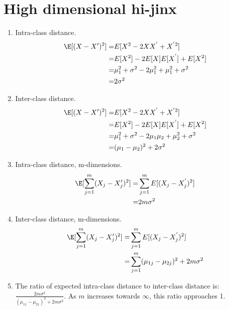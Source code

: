 \section{High dimensional hi-jinx}

\begin{enumerate}
\item Intra-class distance. \begin{align*}
\E[(X-X')^{2}]= & E[X^{2}-2XX^{'}+X^{'2}]\\
= & E[X^{2}]-2E[X]E[X^{'}]+E[X^{2}]\\
= & \mu_{1}^{2}+\sigma^{2}-2\mu_{1}^{2}+\mu_{1}^{2}+\sigma^{2}\\
= & 2\sigma^{2}\end{align*}

\item Inter-class distance. \begin{align*}
\E[(X-X')^{2}]= & E[X^{2}-2XX^{'}+X^{'2}]\\
= & E[X^{2}]-2E[X]E[X^{'}]+E[X^{2}]\\
= & \mu_{1}^{2}+\sigma^{2}-2\mu_{1}\mu_{2}+\mu_{2}^{2}+\sigma^{2}\\
= & (\mu_{1}-\mu_{2})^{2}+2\sigma^{2}\end{align*}

\item Intra-class distance, m-dimensions. \begin{align*}
\E[\sum_{j=1}^{m}(X_{j}-X'_{j})^{2}]= & \sum_{j=1}^{m}E[(X_{j}-X_{j}^{'})^{2}]\\
= & 2m\sigma^{2}\end{align*}

\item Inter-class distance, m-dimensions. \begin{align*}
\E[\sum_{j=1}^{m}(X_{j}-X'_{j})^{2}]= & \sum_{j=1}^{m}E[(X_{j}-X_{j}^{'})^{2}]\\
= & \sum_{j=1}^{m}(\mu_{1j}-\mu_{2j})^{2}+2m\sigma^{2}\end{align*}

\item The ratio of expected intra-class distance to inter-class distance
is: $\frac{2m\sigma^{2}}{(\mu_{11}-\mu_{21})^{2}+2m\sigma^{2}}$.
As $m$ increases towards $\infty$, this ratio approaches 1. 
\end{enumerate}
